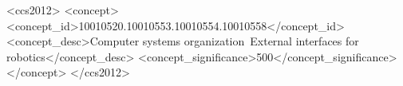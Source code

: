 \documentclass{sig-alternate-05-2015}
\begin{document}
%
%
\begin{CCSXML}
<ccs2012>
<concept>
<concept_id>10010520.10010553.10010554.10010558</concept_id>
<concept_desc>Computer systems organization~External interfaces for robotics</concept_desc>
<concept_significance>500</concept_significance>
</concept>
</ccs2012>
\end{CCSXML}



%
%

%
%
\printccsdesc


\end{document}
